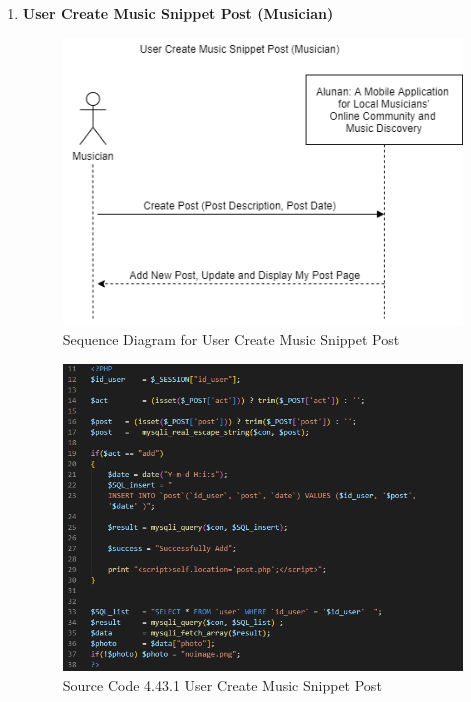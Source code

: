 \begin{enumerate}[1.]
    \item \textbf{User Create Music Snippet Post (Musician)}
    \begin{figure}[h]
        \centering
        \includegraphics[width=0.8\linewidth]{mainmatter/images/systemint/sicreatepost.png}
        \caption{Sequence Diagram for User Create Music Snippet Post}
        \label{fig:myfig79}
    \end{figure}
    \begin{figure}[h]\ContinuedFloat
        \centering
        \includegraphics[width=0.9\linewidth]{mainmatter/images/systemint/codeaddpost.png}
        \caption*{Source Code 4.43.1 User Create Music Snippet Post}
        \label{fig:myfig79a}
    \end{figure}
    \clearpage


\end{enumerate}
